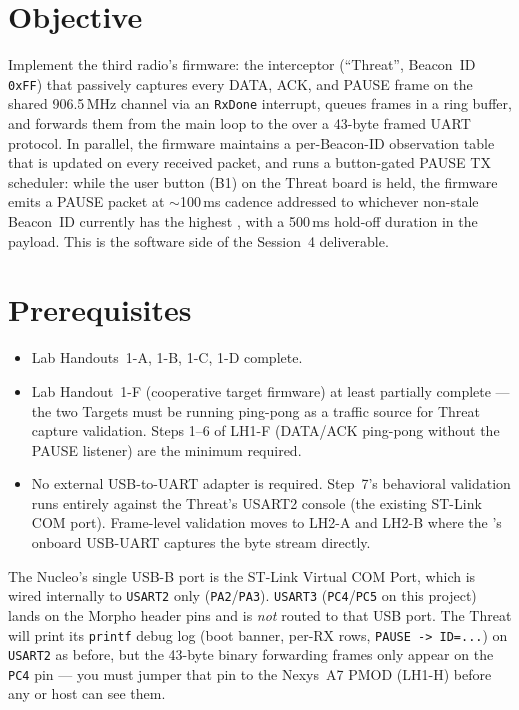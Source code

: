 \documentclass[11pt,letterpaper]{article}
\begin{document}

\section{Objective}
Implement the third radio's firmware: the interceptor (``Threat'', Beacon~ID \texttt{0xFF}) that passively captures every DATA, ACK, and PAUSE frame on the shared 906.5\,MHz channel via an \texttt{RxDone} interrupt, queues frames in a ring buffer, and forwards them from the main loop to the \FPGA{} over a 43-byte framed UART protocol. In parallel, the firmware maintains a per-Beacon-ID \RSSI{} observation table that is updated on every received packet, and runs a button-gated PAUSE TX scheduler: while the user button (B1) on the Threat board is held, the firmware emits a PAUSE packet at $\sim$100\,ms cadence addressed to whichever non-stale Beacon~ID currently has the highest \RSSI{}, with a 500\,ms hold-off duration in the payload. This is the software side of the Session~4 deliverable.

\section{Prerequisites}
\begin{itemize}[leftmargin=2em]
	\item Lab Handouts~1-A, 1-B, 1-C, 1-D complete.
	\item Lab Handout~1-F (cooperative target firmware) at least partially complete --- the two Targets must be running ping-pong as a traffic source for Threat capture validation. Steps 1--6 of LH1-F (DATA/ACK ping-pong without the PAUSE listener) are the minimum required.
	\item No external USB-to-UART adapter is required. Step~7's behavioral validation runs entirely against the Threat's USART2 console (the existing ST-Link \mbox{COM} port). Frame-level validation moves to LH2-A and LH2-B where the \FPGA{}'s onboard USB-UART captures the byte stream directly.
\end{itemize}

\begin{tcolorbox}[infobox={USART3 is not on the ST-Link USB Port}]
The Nucleo's single USB-B port is the ST-Link Virtual COM Port, which is wired internally to \texttt{USART2} only (\texttt{PA2}/\texttt{PA3}). \texttt{USART3} (\texttt{PC4}/\texttt{PC5} on this project) lands on the \mbox{Morpho} header pins and is \emph{not} routed to that USB port. The Threat will print its \texttt{printf} debug log (boot banner, per-RX rows, \texttt{PAUSE -> ID=...}) on \texttt{USART2} as before, but the 43-byte binary forwarding frames only appear on the \texttt{PC4} pin --- you must jumper that pin to the Nexys~A7 \mbox{PMOD} (LH1-H) before any \FPGA{} or host can see them.
\end{tcolorbox}
\end{document}
